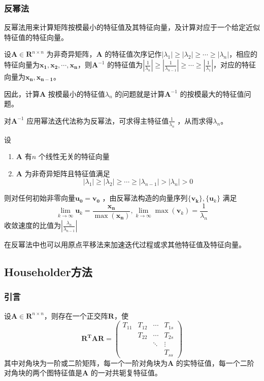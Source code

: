 \documentclass[a4paper]{article}
\begin{document}
\subsubsection{反幂法}
反幂法用来计算矩阵按模最小的特征值及其特征向量，及计算对应于一个给定近似特征值的特征向量。

设$\mathbf{A} \in  \mathbf{R}^{n \times n}$ 为非奇异矩阵，$\mathbf{A}$ 的特征值次序记作$| \lambda_1 | \ge | \lambda_2 | \ge \cdots \ge | \lambda_n |$，相应的特征向量为$\mathbf{x_1}, \mathbf{x_2}, \cdots, \mathbf{x_n}$，则$\mathbf{A}^{-1}$ 的特征值为$| \frac{1}{\lambda_n} | \ge | \frac{1}{\lambda_{n-1}} | \ge \cdots \ge | \frac{1}{\lambda_1} |$，对应的特征向量为$\mathbf{x_{n}}, \mathbf{x_{n-1}}$。

因此，计算$\mathbf{A}$ 按模最小的特征值$\lambda_n$ 的问题就是计算$\mathbf{A}^{-1}$ 的按模最大的特征值问题。

对$\mathbf{A}^{-1}$ 应用幂法迭代法称为反幂法，可求得主特征值$\frac{1}{\lambda_n}$ ，从而求得$\lambda_n$。

\begin{theorem}
	设
	\begin{enumerate}
		\item $\mathbf{A}$ 有$n$ 个线性无关的特征向量
		\item $\mathbf{A}$ 为非奇异矩阵且特征值满足
			\[
			| \lambda_1 | \ge | \lambda_2 | \ge \cdots \ge | \lambda_{n-1} | > | \lambda_n | > 0
			\] 
	\end{enumerate}
	则对任何初始非零向量$\mathbf{u_0} = \mathbf{v_0}$ ，由反幂法构造的向量序列$\{ \mathbf{v_k} \} , \{ \mathbf{u}_k \} $ 满足
	\[
	\lim_{k \to \infty} \mathbf{u}_k = \frac{\mathbf{x_{n}}}{\max(\mathbf{x_{n}})}, \lim_{k \to \infty} \max(\mathbf{v}_k) = \frac{1}{\lambda_n}
	\] 
	收敛速度的比值为$\left| \frac{\lambda_n}{\lambda_{n-1}} \right| $
\end{theorem}

在反幂法中也可以用原点平移法来加速迭代过程或求其他特征值及特征向量。

\subsection{Householder方法}
\subsubsection{引言}

\begin{thoerem}
	设$\mathbf{A} \in \mathbf{R}^{n \times n}$，则存在一个正交阵$\mathbf{R}$，使
	\[
	\mathbf{R^{T}AR} = \begin{pmatrix} 
		T_{11} & T_{12} & \cdots & T_{1s} \\
		       & T_{22} & \cdots & T_{2s} \\
		       & & \ddots & \vdots \\
		       & & & T_{ss}
	\end{pmatrix} 
	\] 
	其中对角块为一阶或二阶矩阵，每一个一阶对角块为$\mathbf{A}$ 的实特征值，每一个二阶对角块的两个图特征值是$\mathbf{A}$ 的一对共轭复特征值。
\end{thoerem}
\end{document}
